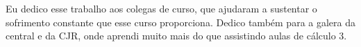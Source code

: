 Eu dedico esse trabalho aos colegas de curso, que ajudaram a sustentar o sofrimento constante que esse curso proporciona. Dedico também para a galera da central e da CJR, onde aprendi muito mais do que assistindo aulas de cálculo 3.